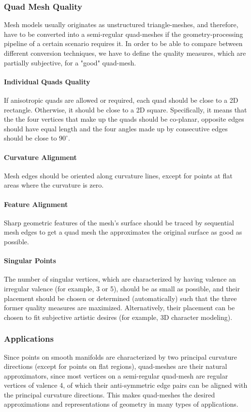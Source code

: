 \subsubsection{Quad Mesh Quality}
Mesh models usually originates as unstructured triangle-meshes, and therefore, have to be converted into a semi-regular quad-meshes if the geometry-processing pipeline of a certain scenario requires it. In order to be able to compare between different conversion techniques, we have to define the quality measures, which are partially subjective, for a "good" quad-mesh.
\paragraph{Individual Quads Quality} If anisotropic quads are allowed or required, each quad should be close to
a 2D rectangle. Otherwise, it should be close to a 2D square. Specifically, it means that the the four vertices that make up the quads should be co-planar, opposite edges should have equal length and the four angles made up by consecutive edges should be close to $90^\circ$.
\paragraph{Curvature Alignment} Mesh edges should be oriented along curvature lines, except for points at flat areas where the curvature is zero.
\paragraph{Feature Alignment} Sharp geometric features of the mesh's surface should be traced by sequential mesh edges to get a quad mesh the approximates the original surface as good as possible.
\paragraph{Singular Points} The number of singular vertices, which are characterized by having valence an irregular valence (for example, 3 or 5), should be as small as possible, and their placement should be chosen or determined (automatically) such that the three former quality measures are maximized. Alternatively, their placement can be chosen to fit subjective artistic desires (for example, 3D character modeling).
\subsubsection{Applications}
Since points on smooth manifolds are characterized by two principal curvature directions (except for points on flat regions), quad-meshes are their natural approximators, since most vertices on a semi-regular quad-mesh are regular vertices of valence 4, of which their anti-symmetric edge pairs can be aligned with the principal curvature directions. This makes quad-meshes the desired approximations and representations of geometry in many types of applications.
